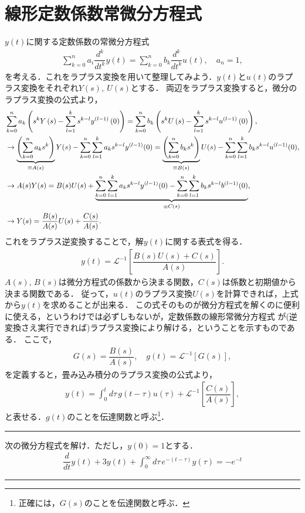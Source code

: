 \section{線形定数係数常微分方程式}
%
$y(t)$に関する定数係数の常微分方程式
\begin{align}
 \sum_{k=0}^{n}a_i\dfrac{d^{k}}{dt^{k}}y(t) = \sum_{k=0}^{n}b_{k}\dfrac{d^k}{dt^k}u(t),\quad a_n=1, 
\end{align}
を考える．これをラプラス変換を用いて整理してみよう．$y(t)$と$u(t)$のラプラス変換をそれぞれ$Y(s),~U(s)$とする．
両辺をラプラス変換すると，微分のラプラス変換の公式より，
\begin{align}
   &\sum_{k=0}^{n}a_{k}\left(s^{k}Y\left(s\right)-\sum_{l=1}^{k}s^{k-l}y^{\left(l-1\right)}\left(0\right)\right) =\sum_{k=0}^{n}b_{k}\left(s^{k}U\left(s\right)-\sum_{l=1}^{k}s^{k-l}u^{\left(l-1\right)}\left(0\right)\right), \notag \\
   &\rightarrow \underbrace{\left(\sum_{k=0}^{n}a_{k}s^{k}\right)}_{\equiv A(s)} Y (s) 
    - \sum_{k=0}^{n}\sum_{l=1}^{k}a_{k}s^{k-l}y^{(l-1)}(0) 
   = \underbrace{\left(\sum_{k=0}^{n}b_{k}s^{k}\right)}_{\equiv B(s)}U(s) - \sum_{k=0}^{n}\sum_{l=1}^{k}b_{k}s^{k-l}u^{(l-1)}(0), \notag \\
   &\rightarrow A(s)Y(s) = B(s)U(s) + 
   \underbrace{\sum_{k=0}^{n}\sum_{l=1}^{k}a_{k}s^{k-l}y^{(l-1)}(0) - \sum_{k=0}^{n}\sum_{l=1}^{k}b_{k}s^{k-l}b^{(l-1)}(0)}_{\equiv C(s)}, \notag \\
   &\rightarrow Y(s) = \dfrac{B(s)}{A(s)}U(s) + \dfrac{C(s)}{A(s)}.
\end{align}
これをラプラス逆変換することで，解$y(t)$に関する表式を得る．
\begin{align}
 y(t) = \mathcal{L}^{-1}\left[\dfrac{B(s)U(s)+C(s)}{A(s)}\right]. 
\end{align}
$A(s)$, $B(s)$は微分方程式の係数から決まる関数，$C(s)$は係数と初期値から決まる関数である．
従って，$u(t)$のラプラス変換$U(s)$を計算できれば，上式から$y(t)$を求めることが出来る．
この式そのものが微分方程式を解くのに便利に使える，というわけでは必ずしもないが，定数係数の線形常微分方程式
が(逆変換さえ実行できれば)ラプラス変換により解ける，ということを示すものである．
ここで，
\begin{align}
  G(s) = \dfrac{B(s)}{A(s)},\quad g(t) = \mathcal{L}^{-1}\left[G(s)\right],
\end{align}
を定義すると，畳み込み積分のラプラス変換の公式より，
\begin{align}
 y(t) = \int_{0}^{t}d\tau\,g(t-\tau)u(\tau) + \mathcal{L}^{-1}\left[\dfrac{C(s)}{A(s)}\right], 
\end{align}
と表せる．$g(t)$のことを伝達関数と呼ぶ\footnote{正確には，$G(s)$のことを伝達関数と呼ぶ．}．
%
\newpage
%
\hrule
\reidai
次の微分方程式を解け．ただし，$y(0)=1$とする．
\begin{align}
 \dfrac{d}{dt}y(t) + 3y(t) + \int_{0}^{\infty}d \tau\, e^{-(t-\tau)}y(\tau) = -e^{-t} 
\end{align}
\hrule
\vspace*{.2cm}

